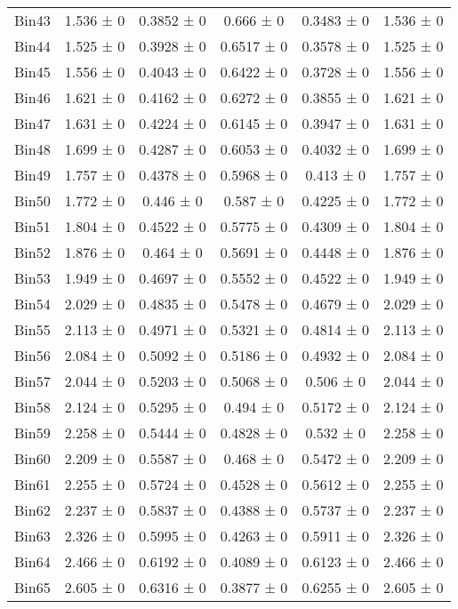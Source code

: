 \begin{tabular}{@{\extracolsep{4pt}}lccccc@{}}
     Bin43 & 1.536 ± 0 & 0.3852 ± 0 & 0.666 ± 0 & 0.3483 ± 0 & 1.536 ± 0 \\ 
     Bin44 & 1.525 ± 0 & 0.3928 ± 0 & 0.6517 ± 0 & 0.3578 ± 0 & 1.525 ± 0 \\ 
     Bin45 & 1.556 ± 0 & 0.4043 ± 0 & 0.6422 ± 0 & 0.3728 ± 0 & 1.556 ± 0 \\ 
     Bin46 & 1.621 ± 0 & 0.4162 ± 0 & 0.6272 ± 0 & 0.3855 ± 0 & 1.621 ± 0 \\ 
     Bin47 & 1.631 ± 0 & 0.4224 ± 0 & 0.6145 ± 0 & 0.3947 ± 0 & 1.631 ± 0 \\ 
     Bin48 & 1.699 ± 0 & 0.4287 ± 0 & 0.6053 ± 0 & 0.4032 ± 0 & 1.699 ± 0 \\ 
     Bin49 & 1.757 ± 0 & 0.4378 ± 0 & 0.5968 ± 0 & 0.413 ± 0 & 1.757 ± 0 \\ 
     Bin50 & 1.772 ± 0 & 0.446 ± 0 & 0.587 ± 0 & 0.4225 ± 0 & 1.772 ± 0 \\ 
     Bin51 & 1.804 ± 0 & 0.4522 ± 0 & 0.5775 ± 0 & 0.4309 ± 0 & 1.804 ± 0 \\ 
     Bin52 & 1.876 ± 0 & 0.464 ± 0 & 0.5691 ± 0 & 0.4448 ± 0 & 1.876 ± 0 \\ 
     Bin53 & 1.949 ± 0 & 0.4697 ± 0 & 0.5552 ± 0 & 0.4522 ± 0 & 1.949 ± 0 \\ 
     Bin54 & 2.029 ± 0 & 0.4835 ± 0 & 0.5478 ± 0 & 0.4679 ± 0 & 2.029 ± 0 \\ 
     Bin55 & 2.113 ± 0 & 0.4971 ± 0 & 0.5321 ± 0 & 0.4814 ± 0 & 2.113 ± 0 \\ 
     Bin56 & 2.084 ± 0 & 0.5092 ± 0 & 0.5186 ± 0 & 0.4932 ± 0 & 2.084 ± 0 \\ 
     Bin57 & 2.044 ± 0 & 0.5203 ± 0 & 0.5068 ± 0 & 0.506 ± 0 & 2.044 ± 0 \\ 
     Bin58 & 2.124 ± 0 & 0.5295 ± 0 & 0.494 ± 0 & 0.5172 ± 0 & 2.124 ± 0 \\ 
     Bin59 & 2.258 ± 0 & 0.5444 ± 0 & 0.4828 ± 0 & 0.532 ± 0 & 2.258 ± 0 \\ 
     Bin60 & 2.209 ± 0 & 0.5587 ± 0 & 0.468 ± 0 & 0.5472 ± 0 & 2.209 ± 0 \\ 
     Bin61 & 2.255 ± 0 & 0.5724 ± 0 & 0.4528 ± 0 & 0.5612 ± 0 & 2.255 ± 0 \\ 
     Bin62 & 2.237 ± 0 & 0.5837 ± 0 & 0.4388 ± 0 & 0.5737 ± 0 & 2.237 ± 0 \\ 
     Bin63 & 2.326 ± 0 & 0.5995 ± 0 & 0.4263 ± 0 & 0.5911 ± 0 & 2.326 ± 0 \\ 
     Bin64 & 2.466 ± 0 & 0.6192 ± 0 & 0.4089 ± 0 & 0.6123 ± 0 & 2.466 ± 0 \\ 
     Bin65 & 2.605 ± 0 & 0.6316 ± 0 & 0.3877 ± 0 & 0.6255 ± 0 & 2.605 ± 0 \\ 

\end{tabular}
